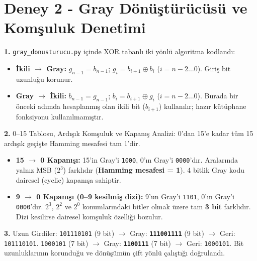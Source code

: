 \documentclass[10pt,a4paper]{article}
\begin{document}
\section*{Deney 2 - Gray Dönüştürücüsü ve Komşuluk Denetimi}

\textbf{1.} \texttt{gray\_donusturucu.py} içinde XOR tabanlı iki yönlü algoritma kodlandı:
\begin{itemize}
    \item \textbf{İkili $\rightarrow$ Gray:} $g_{n-1} = b_{n-1}$; $g_i = b_{i+1} \oplus b_i$ ($i = n-2 \dots 0$). Giriş bit uzunluğu korunur.
    \item \textbf{Gray $\rightarrow$ İkili:} $b_{n-1} = g_{n-1}$; $b_i = b_{i+1} \oplus g_i$ ($i = n-2 \dots 0$). Burada bir önceki adımda hesaplanmış olan ikili bit ($b_{i+1}$) kullanılır; hazır kütüphane fonksiyonu kullanılmamıştır.
\end{itemize}

\textbf{2.} 0--15 Tablosu, Ardışık Komşuluk ve Kapanış Analizi:
0'dan 15'e kadar tüm 15 ardışık geçişte Hamming mesafesi tam 1'dir.
\begin{itemize}
    \item \textbf{15 $\rightarrow$ 0 Kapanışı:} 15'in Gray'i \texttt{1000}, 0'ın Gray'i \texttt{0000}'dır. Aralarında yalnız MSB ($2^3$) farklıdır (\textbf{Hamming mesafesi = 1}). 4 bitlik Gray kodu dairesel (cyclic) kapanışa sahiptir.
    \item \textbf{9 $\rightarrow$ 0 Kapanışı (0--9 kesilmiş dizi):} 9'un Gray'i \texttt{1101}, 0'ın Gray'i \texttt{0000}'dır. $2^3$, $2^2$ ve $2^0$ konumlarındaki bitler olmak üzere tam \textbf{3 bit} farklıdır. Dizi kesilirse dairesel komşuluk özelliği bozulur.
\end{itemize}

\textbf{3.} Uzun Girdiler: \texttt{101110101} (9 bit) $\rightarrow$ Gray: \textbf{\texttt{111001111}} (9 bit) $\rightarrow$ Geri: \texttt{101110101}. \texttt{1000101} (7 bit) $\rightarrow$ Gray: \textbf{\texttt{1100111}} (7 bit) $\rightarrow$ Geri: \texttt{1000101}. Bit uzunluklarının korunduğu ve dönüşümün çift yönlü çalıştığı doğrulandı.
\end{document}
